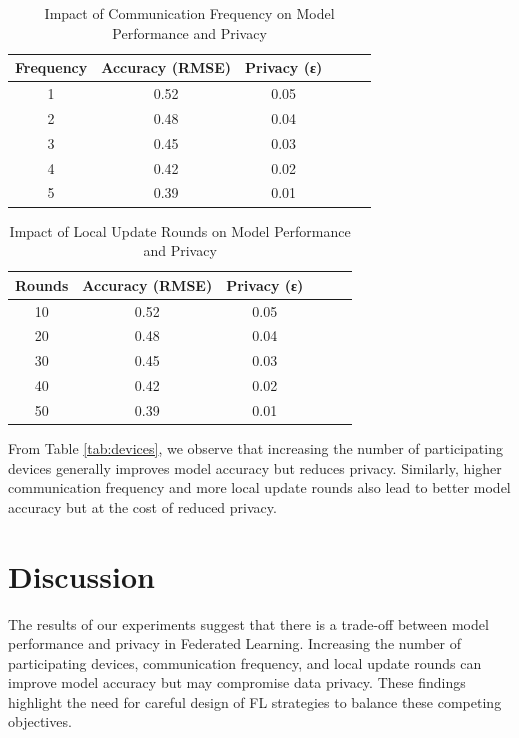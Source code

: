 \documentclass{article}
\begin{document}
\begin{table}[ht]
\centering
\caption{Impact of Communication Frequency on Model Performance and Privacy}
\label{tab:frequency}
\begin{tabular}{@{}cccccc@{}}
\toprule
\textbf{Frequency} & \textbf{Accuracy (RMSE)} & \textbf{Privacy (ε)} \\ \midrule
1                  & 0.52                    & 0.05                 \\
2                  & 0.48                    & 0.04                 \\
3                  & 0.45                    & 0.03                 \\
4                  & 0.42                    & 0.02                 \\
5                  & 0.39                    & 0.01                 \\ \bottomrule
\end{tabular}
\end{table}

\begin{table}[ht]
\centering
\caption{Impact of Local Update Rounds on Model Performance and Privacy}
\label{tab:rounds}
\begin{tabular}{@{}cccccc@{}}
\toprule
\textbf{Rounds} & \textbf{Accuracy (RMSE)} & \textbf{Privacy (ε)} \\ \midrule
10              & 0.52                    & 0.05                 \\
20              & 0.48                    & 0.04                 \\
30              & 0.45                    & 0.03                 \\
40              & 0.42                    & 0.02                 \\
50              & 0.39                    & 0.01                 \\ \bottomrule
\end{tabular}
\end{table}

From Table \ref{tab:devices}, we observe that increasing the number of participating devices generally improves model accuracy but reduces privacy. Similarly, higher communication frequency and more local update rounds also lead to better model accuracy but at the cost of reduced privacy.

\section{Discussion}
The results of our experiments suggest that there is a trade-off between model performance and privacy in Federated Learning. Increasing the number of participating devices, communication frequency, and local update rounds can improve model accuracy but may compromise data privacy. These findings highlight the need for careful design of FL strategies to balance these competing objectives.
\end{document}
